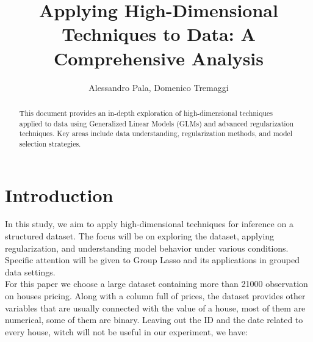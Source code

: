 \documentclass[a4paper, 12pt]{article}
\title{Applying High-Dimensional Techniques to Data: A Comprehensive Analysis}
\author{Alessandro Pala, Domenico Tremaggi}
\begin{document}
\maketitle

\begin{abstract}
\noindent
This document provides an in-depth exploration of high-dimensional techniques applied to data using Generalized Linear Models (GLMs) and advanced regularization techniques. Key areas include data understanding, regularization methods, and model selection strategies.
\end{abstract}

\section*{Introduction}
\noindent
In this study, we aim to apply high-dimensional techniques for inference on a structured dataset. The focus will be on exploring the dataset, applying regularization, and understanding model behavior under various conditions. Specific attention will be given to Group Lasso and its applications in grouped data settings.  \\
For this paper we choose a large dataset containing more than 21000 observation on houses pricing. Along with a column full of prices, the dataset provides other variables that are usually connected with the value of a house, most of them are numerical, some of them are binary. Leaving out the ID and the date related to every house, witch will not be useful in our experiment, we have:
\end{document}
